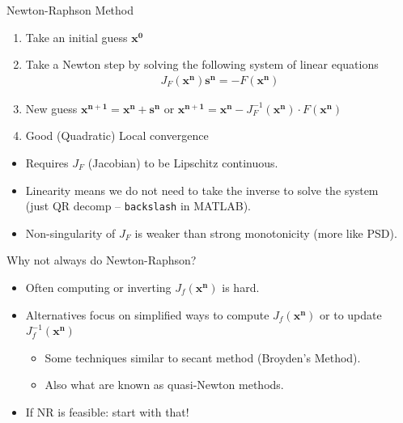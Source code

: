 \documentclass[xcolor=pdftex,dvipsnames,table,mathserif,aspectratio=169]{beamer}
\begin{document}
\begin{frame}{Newton-Raphson Method}
\begin{enumerate}
\item Take an initial guess $\mathbf{x^0}$
\item Take a Newton step by solving the following system of linear equations
\begin{eqnarray*}
J_F(\mathbf{x^n}) \mathbf{s^n} = - F(\mathbf{x^n})
\end{eqnarray*}
\item New guess $\mathbf{x^{n+1}} =\mathbf{x^n} + \mathbf{s^n}$ or  $\mathbf{x^{n+1}} =\mathbf{x^n} - J_F^{-1}(\mathbf{x^n})\cdot F(\mathbf{x^n}) $ 
\item Good (Quadratic) Local convergence
\end{enumerate}
\begin{itemize}
\item Requires $J_F$ (Jacobian) to be Lipschitz continuous. 
\item Linearity means we do not need to take the inverse to solve the system\\
 (just QR decomp -- \texttt{backslash} in MATLAB).
\item Non-singularity of $J_F$ is weaker than strong monotonicity (more like PSD).
\end{itemize}
\end{frame} 

\begin{frame}{Why not always do Newton-Raphson?}
\begin{itemize}
\item Often computing or inverting $J_f(\mathbf{x^n})$ is hard.
\item Alternatives focus on simplified ways to compute $J_f(\mathbf{x^n})$ or to update $J_f^{-1}(\mathbf{x^n})$
\begin{itemize}
\item Some techniques similar to \alert{secant method} (Broyden's Method).
\item Also what are known as \alert{quasi-Newton} methods.
\end{itemize}
\item If NR is feasible: start with that!
\end{itemize}
\end{frame} 
\end{document}
